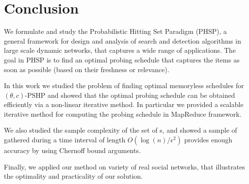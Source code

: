 \section{Conclusion}
We formulate and study the Probabilistic Hitting Set Paradigm (PHSP),
a general framework for design and analysis of search and detection algorithms
in large scale dynamic networks, that  captures a wide range of applications. The goal in PHSP is to find an optimal probing schedule that captures the items as soon as possible (based on their freshness or relevance).

In this work we studied the problem of finding optimal memoryless schedules for $(\theta,c)$-PSHP and showed that the optimal probing schedule can be obtained efficiently via a non-linear iterative method. In particular we provided a scalable iterative method for computing the probing schedule in MapReduce framework.

We also studied the sample complexity of the set of {\ins}s, and showed a sample of {\ins} gathered during a time interval of length $O(\log(n)/\epsilon^2)$ provides enough accuracy by using Chernoff bound arguments.

Finally, we applied our method on variety of real social networks, that illustrates the optimality and practicality of our solution.

